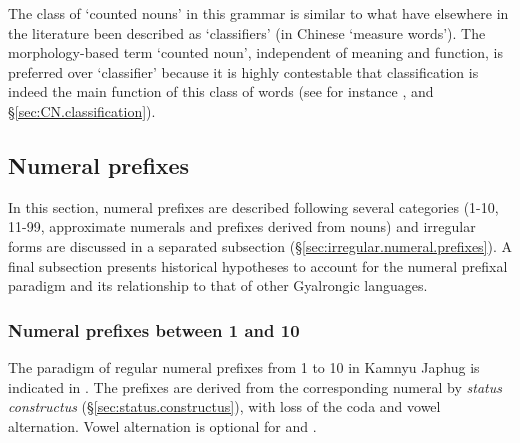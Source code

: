 The class of `counted nouns' in this grammar is similar to what have elsewhere in the literature been described as `classifiers' (in Chinese   `measure words'). The morphology-based term `counted noun', independent of meaning and function, is preferred over `classifier' because it is highly contestable that classification is indeed the main function of this class of words (see for instance  \citealt{francois99classificateurs}, and §\ref{sec:CN.classification}). 

\subsection{Numeral prefixes} \label{sec:numeral.prefixes}
In this section, numeral prefixes are described following several categories (1-10, 11-99, approximate numerals and prefixes derived from nouns) and irregular forms are discussed in a separated subsection (§\ref{sec:irregular.numeral.prefixes}). A final subsection presents historical hypotheses to account for the numeral prefixal paradigm and its relationship to that of other Gyalrongic languages.



\subsubsection{Numeral prefixes between 1 and 10} \label{sec:num.prefixes.1.10}
The paradigm of regular numeral prefixes from 1 to 10 in Kamnyu Japhug is indicated in . The prefixes are derived from the corresponding numeral by \textit{status constructus} (§\ref{sec:status.constructus}), with loss of the coda and vowel alternation. Vowel alternation is optional for  and  . 

%


